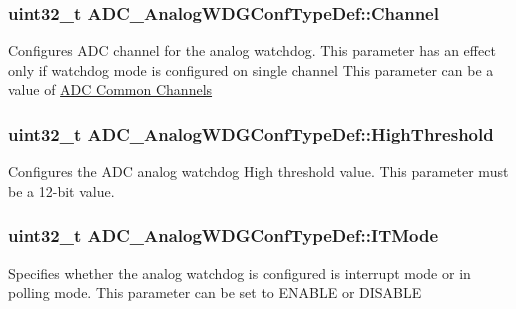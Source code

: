 \subsubsection[{\texorpdfstring{Channel}{Channel}}]{\setlength{\rightskip}{0pt plus 5cm}uint32\+\_\+t A\+D\+C\+\_\+\+Analog\+W\+D\+G\+Conf\+Type\+Def\+::\+Channel}\hypertarget{struct_a_d_c___analog_w_d_g_conf_type_def_abc86b5861e3eff802fe765e62054f348}{}\label{struct_a_d_c___analog_w_d_g_conf_type_def_abc86b5861e3eff802fe765e62054f348}
Configures A\+DC channel for the analog watchdog. This parameter has an effect only if watchdog mode is configured on single channel This parameter can be a value of \hyperlink{group___a_d_c__channels}{A\+DC Common Channels} 
\subsubsection[{\texorpdfstring{High\+Threshold}{HighThreshold}}]{\setlength{\rightskip}{0pt plus 5cm}uint32\+\_\+t A\+D\+C\+\_\+\+Analog\+W\+D\+G\+Conf\+Type\+Def\+::\+High\+Threshold}\hypertarget{struct_a_d_c___analog_w_d_g_conf_type_def_a9bee62b3d364713a16a15cefcc217e65}{}\label{struct_a_d_c___analog_w_d_g_conf_type_def_a9bee62b3d364713a16a15cefcc217e65}
Configures the A\+DC analog watchdog High threshold value. This parameter must be a 12-\/bit value. 
\subsubsection[{\texorpdfstring{I\+T\+Mode}{ITMode}}]{\setlength{\rightskip}{0pt plus 5cm}uint32\+\_\+t A\+D\+C\+\_\+\+Analog\+W\+D\+G\+Conf\+Type\+Def\+::\+I\+T\+Mode}\hypertarget{struct_a_d_c___analog_w_d_g_conf_type_def_ab67703b11dbb0303fb5b56bd328ef06d}{}\label{struct_a_d_c___analog_w_d_g_conf_type_def_ab67703b11dbb0303fb5b56bd328ef06d}
Specifies whether the analog watchdog is configured is interrupt mode or in polling mode. This parameter can be set to E\+N\+A\+B\+LE or D\+I\+S\+A\+B\+LE 
